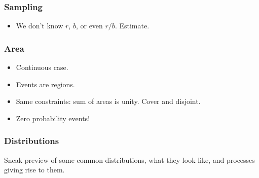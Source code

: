 \documentclass[t]{beamer}
\begin{document}
\begin{frame}
  \frametitle{Sampling}

  \begin{itemize}
  \item We don't know $r$, $b$, or even $r/b$.  Estimate.
  \end{itemize}

\end{frame}

\begin{frame}
  \frametitle{Area}

  \begin{itemize}
  \item Continuous case.
  \item Events are regions.
  \item Same constraints: sum of areas is unity.  Cover and disjoint.
  \item Zero probability events!
  \end{itemize}

\end{frame}

\begin{frame}
  \frametitle{Distributions}

  Sneak preview of some common distributions, what they look like, and processes giving rise to them.
\end{frame}


\end{document}
